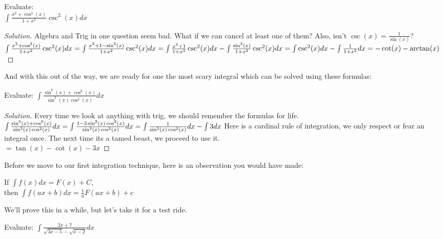 \begin{example}
    Evaluate:\\
    $\int\frac{x^2+\cos^2(x)}{1+x^2}\csc^2(x) dx$
\end{example}
\begin{proof}
    [Solution]
    Algebra and Trig in one question seem bad. What if we can cancel at least one of them? Also, isn't $\csc(x)=\frac{1}{\sin(x)}$?\\
    $\int\frac{x^2+\cos^2(x)}{1+x^2}\csc^2(x) dx\\
    = \int\frac{x^2+1-\sin^2(x)}{1+x^2}\csc^2(x) dx\\
    = \int\frac{x^2+1}{1+x^2}\csc^2(x) dx - \int \frac{\sin^2(x)}{1+x^2}\csc^2(x) dx\\
    = \int \csc^2(x) dx - \int \frac{1}{1+x^2}dx\\
    = -\cot(x) - \arctan(x)$
\end{proof}
And with this out of the way, we are ready for one the most scary integral which can be solved using these formulas:\\
\begin{example}
    Evaluate: $\int \frac{\sin^6(x)+\cos^6(x)}{\sin^2(x)\cos^2(x)} dx$
\end{example}
\begin{proof}
    [Solution]
    Every time we look at anything with trig, we should remember the formulas for life.\\
    $\int \frac{\sin^6(x)+\cos^6(x)}{\sin^2(x)\cos^2(x)} dx\\
    = \int \frac{1-3\sin^2(x)\cos^2(x)}{\sin^2(x)\cos^2(x)} dx\\
    = \int \frac{1}{\sin^2(x)\cos^2(x)}dx - \int 3 dx$
    Here is a cardinal rule of integration, we only respect or fear an integral once. The next time its a tamed beast, we proceed to use it.\\
    $= \tan(x)-\cot(x)-3x$
\end{proof}
Before we move to our first integration technique, here is an observation you would have made:\\
\begin{theorem}
    If $\int f(x) dx = F(x)+C$,\\
    then $\int f(ax+b) dx = \frac{1}{a}F(ax+b)+c$
\end{theorem}
We'll prove this in a while, but let's take it for a test ride.\\
\begin{example}
    Evaluate:
    $\int \frac{2x+7}{\sqrt{3x-5}-\sqrt{x-2}}dx$
\end{example}
